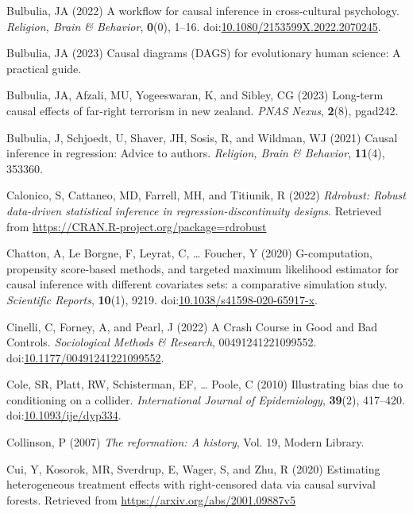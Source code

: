 \documentclass[
  singlecolumn,
  9pt]{article}
\begin{document}
\begin{CSLReferences}
Bulbulia, JA (2022) A workflow for causal inference in cross-cultural
psychology. \emph{Religion, Brain \& Behavior}, \textbf{0}(0), 1--16.
doi:\href{https://doi.org/10.1080/2153599X.2022.2070245}{10.1080/2153599X.2022.2070245}.

Bulbulia, JA (2023) Causal diagrams (DAGS) for evolutionary human
science: A practical guide.

Bulbulia, JA, Afzali, MU, Yogeeswaran, K, and Sibley, CG (2023)
Long-term causal effects of far-right terrorism in new zealand.
\emph{PNAS Nexus}, \textbf{2}(8), pgad242.

Bulbulia, J, Schjoedt, U, Shaver, JH, Sosis, R, and Wildman, WJ (2021)
Causal inference in regression: Advice to authors. \emph{Religion, Brain
\& Behavior}, \textbf{11}(4), 353360.

Calonico, S, Cattaneo, MD, Farrell, MH, and Titiunik, R (2022)
\emph{Rdrobust: Robust data-driven statistical inference in
regression-discontinuity designs}. Retrieved from
\url{https://CRAN.R-project.org/package=rdrobust}

Chatton, A, Le Borgne, F, Leyrat, C, \ldots{} Foucher, Y (2020)
G-computation, propensity score-based methods, and targeted maximum
likelihood estimator for causal inference with different covariates
sets: a comparative simulation study. \emph{Scientific Reports},
\textbf{10}(1), 9219.
doi:\href{https://doi.org/10.1038/s41598-020-65917-x}{10.1038/s41598-020-65917-x}.

Cinelli, C, Forney, A, and Pearl, J (2022) A Crash Course in Good and
Bad Controls. \emph{Sociological Methods \& Research},
00491241221099552.
doi:\href{https://doi.org/10.1177/00491241221099552}{10.1177/00491241221099552}.

Cole, SR, Platt, RW, Schisterman, EF, \ldots{} Poole, C (2010)
Illustrating bias due to conditioning on a collider. \emph{International
Journal of Epidemiology}, \textbf{39}(2), 417--420.
doi:\href{https://doi.org/10.1093/ije/dyp334}{10.1093/ije/dyp334}.

Collinson, P (2007) \emph{The reformation: A history}, Vol. 19, Modern
Library.

Cui, Y, Kosorok, MR, Sverdrup, E, Wager, S, and Zhu, R (2020) Estimating
heterogeneous treatment effects with right-censored data via causal
survival forests. Retrieved from
\url{https://arxiv.org/abs/2001.09887v5}


\end{CSLReferences}
\end{document}
